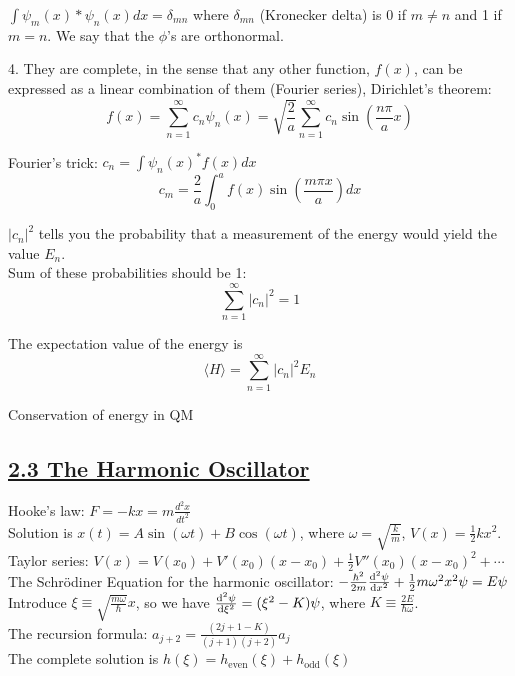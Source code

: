 $\int \psi_m (x)* \psi_n(x) dx = \delta_{mn}$
where $\delta_{mn}$ (Kronecker delta) is 0 if $m \neq n$ and 1 if $m=n$. We say that the $\phi$'s are orthonormal.

4. They are complete, in the sense that any other function, $f(x)$, can be expressed as a linear combination of them (Fourier series), Dirichlet's theorem:
    $$f(x) = \sum_{n=1}^{\infty} c_n \psi_n(x) = \sqrt{\frac{2}{a}} \sum_{n=1}^{\infty} c_n \sin(\frac{n \pi}{a} x)$$

Fourier's trick: $c_n = \int \psi_n(x)^* f(x) dx$ \\
$$c_m = \frac{2}{a} \int_0^a f(x) \sin(\frac{m \pi x}{a}) dx$$

$|c_n|^2$ tells you the probability that a measurement of the energy would yield the value $E_n$. \\

Sum of these probabilities should be 1: 
    $$\sum_{n=1}^{\infty} |c_n|^2 = 1$$

The expectation value of the energy is
    $$\langle H \rangle = \sum_{n=1}^{\infty} |c_n|^2 E_n$$

Conservation of energy in QM

\subsection{\underline{2.3 The Harmonic Oscillator}}
Hooke's law: $F = -kx = m \frac{d^2 x}{d t^2}$ \\
Solution is $x(t) = A \sin(\omega t) + B \cos(\omega t)$, where $\omega = \sqrt{\frac{k}{m}}$, $V(x) = \frac{1}{2} k x^2$. \\

Taylor series: $V(x) = V(x_0) + V'(x_0) (x - x_0) + \frac{1}{2} V''(x_0)(x- x_0)^2 + \cdots$ \\

The Schr\"{o}diner Equation for the harmonic oscillator: $-\frac{\hbar^2}{2m} \dv[2]{\psi}{x} + \frac{1}{2} m \omega^2 x^2 \psi = E \psi$ \\
Introduce $\xi \equiv \sqrt{\frac{m \omega}{\hbar}} x$, so we have $\dv[2]{\psi}{\xi} = (\xi^2 - K) \psi$, where $K \equiv \frac{2E}{\hbar \omega}$. \\

The recursion formula: $a_{j+2} = \frac{(2j + 1 - K)}{(j + 1)(j + 2)} a_j$ \\
The complete solution is $h(\xi) = h_{\text{even}}(\xi) + h_{\text{odd}}(\xi)$ \\

